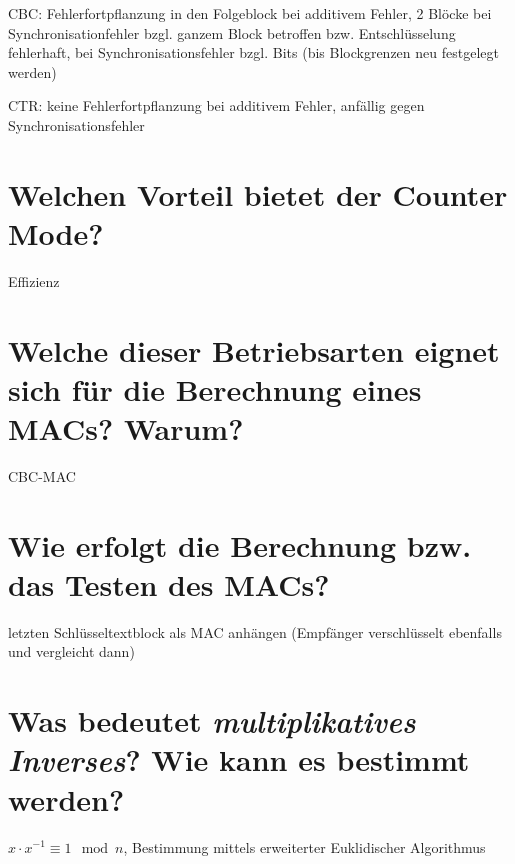 \documentclass{article}
\begin{document}
	CBC: Fehlerfortpflanzung in den Folgeblock bei additivem Fehler, 2 Blöcke bei Synchronisationfehler bzgl. ganzem Block betroffen bzw. Entschlüsselung fehlerhaft, bei Synchronisationsfehler bzgl. Bits (bis Blockgrenzen neu festgelegt werden)
	
	CTR: keine Fehlerfortpflanzung bei additivem Fehler, anfällig gegen Synchronisationsfehler
	
	\section*{Welchen Vorteil bietet der Counter Mode?}
	Effizienz
	
	\section*{Welche dieser Betriebsarten eignet sich für die Berechnung eines MACs? Warum?}
	CBC-MAC
	
	\section*{Wie erfolgt die Berechnung bzw. das Testen des MACs?}
	letzten Schlüsseltextblock als MAC anhängen (Empfänger verschlüsselt ebenfalls und vergleicht dann)
	
	\section*{Was bedeutet \textit{multiplikatives Inverses}? Wie kann es bestimmt werden?}
	$x\cdot x^{-1} \equiv 1\mod n$, Bestimmung mittels erweiterter Euklidischer Algorithmus
	
\end{document}
